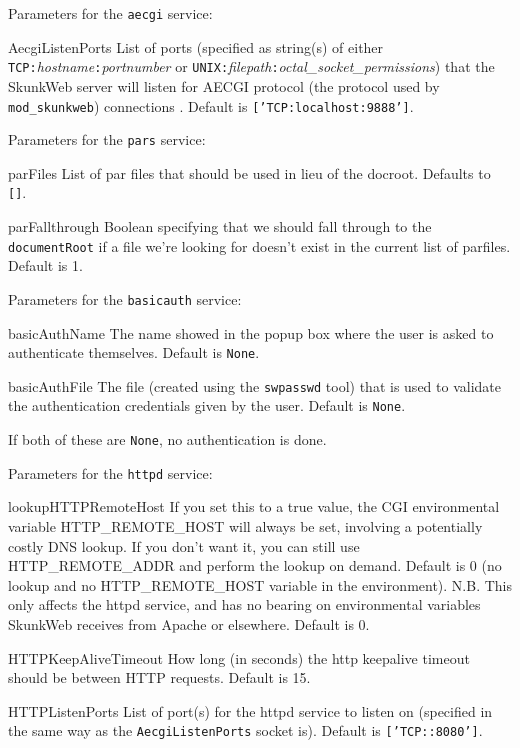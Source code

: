 \documentclass[titlepage]{manual}
\begin{document}
Parameters for the \texttt{aecgi} service:
\begin{argdesc}
\item[AecgiListenPorts] \nonscope
List of ports (specified as string(s) of either
\texttt{TCP:}\emph{hostname}\texttt{:}\emph{portnumber} or
\texttt{UNIX:}\emph{filepath}\texttt{:}\emph{octal_socket_permissions})
that the SkunkWeb server will listen for AECGI protocol (the protocol used
by \texttt{mod\_skunkweb}) connections .
Default is \texttt{['TCP:localhost:9888']}.
\end{argdesc}



Parameters for the \texttt{pars} service:
\begin{argdesc}
\item[parFiles] List of par files that should be used in lieu of the
docroot.  Defaults to \texttt{[]}.
\item[parFallthrough] Boolean specifying that we should fall through
to the \texttt{documentRoot} if a file we're looking for doesn't exist
in the current list of parfiles.  Default is 1.
\end{argdesc}



Parameters for the \texttt{basicauth} service:
\begin{argdesc}
\item[basicAuthName] The name showed in the popup box where the user is asked to authenticate themselves.  Default is \texttt{None}.
\item[basicAuthFile] The file (created using the \texttt{swpasswd} tool) that is used to validate the authentication credentials given by the user.  Default is \texttt{None}.
\end{argdesc}
If both of these are \texttt{None}, no authentication is done.



Parameters for the \texttt{httpd} service:
\begin{argdesc}
\item[lookupHTTPRemoteHost] \nonscope
If you set this to a true value, the CGI environmental variable
HTTP_REMOTE_HOST will always be set, involving a potentially costly DNS
lookup.  If you don't want it, you can still use HTTP_REMOTE_ADDR and
perform the lookup on demand.  Default is 0 (no lookup and no HTTP_REMOTE_HOST
variable in the environment).
N.B. This only affects the httpd service, and has no bearing on environmental
variables SkunkWeb receives from Apache or elsewhere.
Default is 0.
\item[HTTPKeepAliveTimeout] \nonscope
How long (in seconds) the http keepalive timeout should be between
HTTP requests.
Default is 15.
\item[HTTPListenPorts] \nonscope
List of port(s) for the httpd service to listen on (specified in the same
way as the \texttt{AecgiListenPorts} socket is).
Default is \texttt{['TCP::8080']}.
\end{argdesc}
\end{document}
